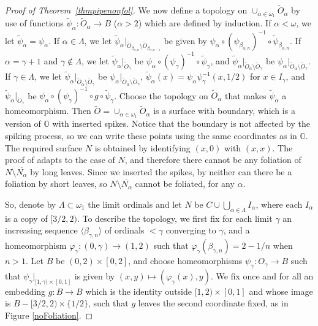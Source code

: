 \documentclass{amsart}
\begin{document}
\begin{proof}[Proof of Theorem~\ref{thmpipenonfol}]
We now define a topology on $\cup_{\alpha\in\omega_1}\widetilde{O}_\alpha$ by use of functions $\widetilde{\psi}_\alpha:\widetilde{O}_\alpha\to B$ ($\alpha>2$) which are defined by induction. If $\alpha < \omega$, we let
$\widetilde{\psi}_\alpha =\psi_\alpha$. If $\alpha\in\Lambda$, we let
$\widetilde{\psi}_\alpha|_{\widetilde{O}_{\beta_{\alpha,n}}\setminus\widetilde{O}_{\beta_{\alpha,n-1}}}$ 
be given by
$\psi_\alpha\circ(\psi_{\beta_{\alpha,n}})^{-1}\circ\widetilde{\psi}_{\beta_{\alpha,n}}$.
If $\alpha=\gamma+1$ and $\gamma\notin\Lambda$, we let
$\widetilde{\psi}_\alpha|_{\widetilde{O}_\gamma}$ be
$\psi_\alpha\circ(\psi_\gamma)^{-1}\circ\widetilde{\psi}_\gamma$,
and 
$\widetilde{\psi}_\alpha|_{\widetilde{O}_\alpha \setminus \widetilde{O}_\gamma}$ be $\psi_\alpha|_{\widetilde{O}_\alpha\setminus \widetilde{O}_\gamma}$. 
If $\gamma\in\Lambda$, we let
$\widetilde{\psi}_\alpha|_{\widetilde{O}_\alpha \setminus \widetilde{O}_\gamma}$ be $\psi_\alpha|_{\widetilde{O}_\alpha \setminus \widetilde{O}_\gamma}$,
$\widetilde{\psi}_\alpha(x)=\psi_\alpha\psi_\gamma^{-1}(x,1/2)$ for $x\in I_\gamma$, and
$\widetilde{\psi}_\alpha|_{\widetilde{O}_\gamma}$ be
$\psi_\alpha\circ(\psi_\gamma)^{-1}\circ g\circ\widetilde{\psi}_\gamma$. 
Choose the topology on $\widetilde{O}_\alpha$ that makes $\widetilde{\psi}_\alpha$ a
homeomorphism. Then
$\widetilde{O}=\cup_{\alpha\in\omega_1}\widetilde{O}_\alpha$
is a surface with boundary, which is a version of ${\mathbb{O}}$ with inserted spikes. Notice that the boundary is not affected by the spiking process, so we can write these points using the same coordinates as in ${\mathbb{O}}$. The required surface $N$ is obtained by identifying $(x,0)$ with $(x,x)$. The proof of \cite[Proposition~6.1]{BGG} adapts to the case of $N$, and therefore there cannot be any foliation of $N\setminus{\overline{{N_\alpha}}}$ by long leaves. Since we inserted the spikes, by \cite[Proposition~4.2]{BGG} neither can there be a foliation by short leaves, so $N\setminus{\overline{{N_\alpha}}}$ cannot be foliated, for any $\alpha$.
\iffalse
{\color{red}
So, denote by $\Lambda\subset\omega_1$ the limit ordinals and
let $N$ be $C\cup\bigcup_{\alpha\in\Lambda}I_\alpha$, where
each $I_\alpha$ is a copy of $[3/2,2)$. To describe the
topology, we first fix for each limit $\gamma$ an increasing
sequence $\langle\beta_{\gamma,n}\rangle$ of ordinals $<\gamma$ converging
to $\gamma$, and a homeomorphism $\varphi_\gamma:(0,\gamma)\to
(1,2)$ such that $\varphi_\gamma(\beta_{\gamma,n})=2-1/n$ when
$n>1$. Let $B$ be $(0,2)\times[0,2]$, and choose
homeomorphisms $\psi_\gamma:O_\gamma\to B$ such that
$\psi_\gamma |_{[1,\gamma)\times[0,1]}$ is given by
$(x,y)\mapsto (\varphi_\gamma(x),y)$. We fix once and for all
an embedding  $g:B\to B$ which is the identity outside
$[1,2)\times[0,1]$ and whose image is $B -
[3/2,2)\times\{1/2\}$, such that $g$ leaves the second
coordinate fixed, as in Figure \ref{noFoliation}.

}
\end{proof}
\end{document}
